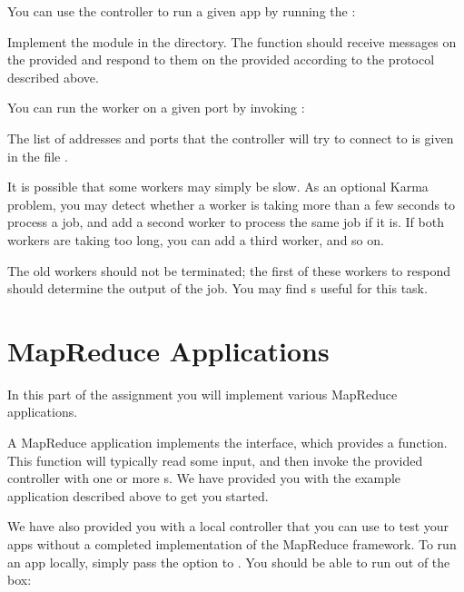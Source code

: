 \documentclass{pset}
\begin{document}
You can use the controller to run a given app by running the
:
\begin{ocaml}
\end{ocaml}


Implement the  module in the 
directory.  The  function should receive messages on the
provided  and respond to them on the provided 
according to the protocol described above.

You can run the worker on a given port by invoking :
\begin{ocaml}
\end{ocaml}

The list of addresses and ports that the controller will try to connect to is
given in the file .


It is possible that some workers may simply be slow.  As an optional Karma
problem, you may detect whether a worker is taking more than a few seconds to
process a job, and add a second worker to process the same job if it is.  If
both workers are taking too long, you can add a third worker, and so on.

The old workers should not be terminated; the first of these workers to respond
should determine the output of the job.  You may find s useful for
this task.

\newpage{}
\part{MapReduce Applications}

In this part of the assignment you will implement various MapReduce
applications.

A MapReduce application implements the  interface, which
provides a  function.  This function will typically read some input,
and then invoke the provided controller with one or more s.
We have provided you with the  example application described
above to get you started.

We have also provided you with a local controller that you can use to test your
apps without a completed implementation of the MapReduce framework.  To run an
app locally, simply pass the  option to
.  You should be able to run  out
of the box:
\begin{ocaml}
\end{ocaml}
\end{document}
